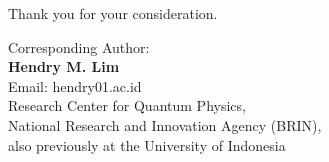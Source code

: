 \documentclass[aps,reprint,onecolumn,amsmath,amssymb,showpacs]{revtex4-1}
\begin{document}
\vspace{10px}

\noindent Thank you for your consideration.

\vspace{5px}

\noindent Corresponding Author:\\
\textbf{Hendry M. Lim}\\
Email: hendry01\@ui.ac.id\\
Research Center for Quantum Physics,\\
National Research and Innovation Agency (BRIN),\\
also previously at the University of Indonesia
\end{document}
